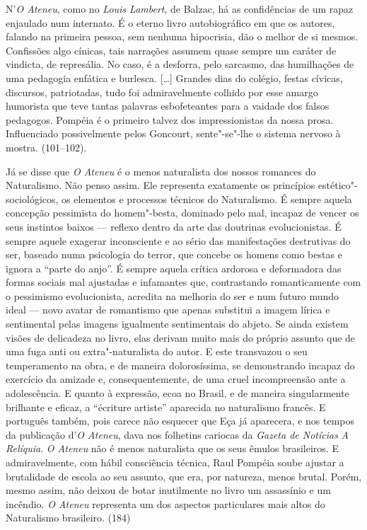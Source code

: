 

N'\textit{O Ateneu}, como no
\textit{Louis Lambert}, de Balzac, há as
confidências de um rapaz enjaulado num internato. É o eterno livro
autobiográfico em que os autores, falando na primeira pessoa, sem
nenhuma hipocrisia, dão o melhor de si mesmos. Confissões algo cínicas,
tais narrações assumem quase sempre um caráter de vindicta, de
represália. No caso, é a desforra, pelo sarcasmo, das humilhações de
uma pedagogia enfática e burlesca. [\ldots] Grandes dias do colégio,
festas cívicas, discursos, patriotadas, tudo foi admiravelmente colhido
por esse amargo humorista que teve tantas palavras esbofeteantes para a
vaidade dos falsos pedagogos. Pompéia é o primeiro talvez dos
impressionistas da nossa prosa. Influenciado possivelmente pelos
Goncourt, sente"-se"-lhe o sistema nervoso à mostra. (101--102).



Já se disse que \textit{O Ateneu} é o menos naturalista dos nossos romances do
Naturalismo. Não penso assim. Ele representa exatamente os princípios
estético"-sociológicos, os elementos e processos técnicos do
Naturalismo. É sempre aquela concepção pessimista do homem"-besta,
dominado pelo mal, incapaz de vencer os seus instintos baixos --- reflexo
dentro da arte das doutrinas evolucionistas. É sempre aquele exagerar
inconsciente e ao sério das manifestações destrutivas do ser, baseado
numa psicologia do terror, que concebe os homens como bestas e ignora a
``parte do anjo''. É sempre aquela crítica ardorosa e deformadora das
formas sociais mal ajustadas e infamantes que, contrastando
romanticamente com o pessimismo evolucionista, acredita na melhoria do
ser e num futuro mundo ideal --- novo avatar de romantismo que apenas
substitui a imagem lírica e sentimental pelas imagens igualmente
sentimentais do abjeto. Se ainda existem visões de delicadeza no livro,
elas derivam muito mais do próprio assunto que de uma fuga anti ou
extra"-naturalista do autor. E este transvazou o seu temperamento na
obra, e de maneira dolorosíssima, se demonstrando incapaz do exercício
da amizade e, consequentemente, de uma cruel incompreensão ante a
adolescência. E quanto à expressão, ecoa no Brasil, e de maneira
singularmente brilhante e eficaz, a ``écriture artiste'' aparecida no
naturalismo francês. E português também, pois carece não esquecer que
Eça já aparecera, e nos tempos da publicação
d'\textit{O Ateneu}, dava nos folhetins cariocas
da \textit{Gazeta de Notícias} \textit{A Relíquia}. \textit{O
Ateneu} não é menos naturalista que os seus êmulos
brasileiros. E admiravelmente, com hábil consciência técnica, Raul
Pompéia soube ajustar a brutalidade de escola ao seu assunto, que era,
por natureza, menos brutal. Porém, mesmo assim, não deixou de botar
inutilmente no livro um assassínio e um incêndio. \textit{O
Ateneu} representa um dos aspectos particulares mais
altos do Naturalismo brasileiro. (184)  

